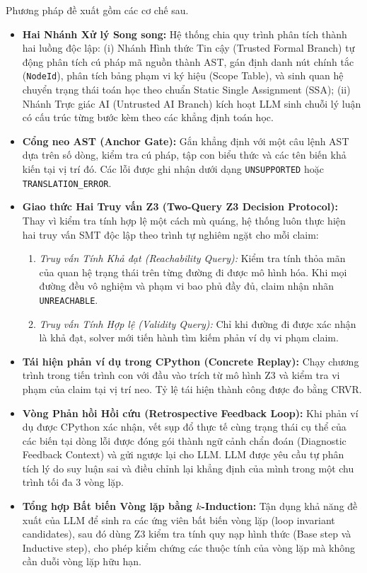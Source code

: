 Phương pháp đề xuất gồm các cơ chế sau.
\begin{itemize}
    \item \textbf{Hai Nhánh Xử lý Song song:} Hệ thống chia quy trình phân tích thành hai luồng độc lập: (i) Nhánh Hình thức Tin cậy (Trusted Formal Branch) tự động phân tích cú pháp mã nguồn thành AST, gán định danh nút chính tắc (\texttt{NodeId}), phân tích bảng phạm vi ký hiệu (Scope Table), và sinh quan hệ chuyển trạng thái toán học theo chuẩn Static Single Assignment (SSA); (ii) Nhánh Trực giác AI (Untrusted AI Branch) kích hoạt LLM sinh chuỗi lý luận có cấu trúc từng bước kèm theo các khẳng định toán học.
    \item \textbf{Cổng neo AST (Anchor Gate):} Gắn khẳng định với một câu lệnh AST dựa trên số dòng, kiểm tra cú pháp, tập con biểu thức và các tên biến khả kiến tại vị trí đó. Các lỗi được ghi nhận dưới dạng \texttt{UNSUPPORTED} hoặc \texttt{TRANSLATION\_ERROR}.
    \item \textbf{Giao thức Hai Truy vấn Z3 (Two-Query Z3 Decision Protocol):} Thay vì kiểm tra tính hợp lệ một cách mù quáng, hệ thống luôn thực hiện hai truy vấn SMT độc lập theo trình tự nghiêm ngặt cho mỗi claim:
    \begin{enumerate}
        \item \textit{Truy vấn Tính Khả đạt (Reachability Query):} Kiểm tra tính thỏa mãn của quan hệ trạng thái trên từng đường đi được mô hình hóa. Khi mọi đường đều vô nghiệm và phạm vi bao phủ đầy đủ, claim nhận nhãn \texttt{UNREACHABLE}.
        \item \textit{Truy vấn Tính Hợp lệ (Validity Query):} Chỉ khi đường đi được xác nhận là khả đạt, solver mới tiến hành tìm kiếm phản ví dụ vi phạm claim.
    \end{enumerate}
    \item \textbf{Tái hiện phản ví dụ trong CPython (Concrete Replay):} Chạy chương trình trong tiến trình con với đầu vào trích từ mô hình Z3 và kiểm tra vi phạm của claim tại vị trí neo. Tỷ lệ tái hiện thành công được đo bằng CRVR.
    \item \textbf{Vòng Phản hồi Hồi cứu (Retrospective Feedback Loop):} Khi phản ví dụ được CPython xác nhận, vết sụp đổ thực tế cùng trạng thái cụ thể của các biến tại dòng lỗi được đóng gói thành ngữ cảnh chẩn đoán (Diagnostic Feedback Context) và gửi ngược lại cho LLM. LLM được yêu cầu tự phân tích lý do suy luận sai và điều chỉnh lại khẳng định của mình trong một chu trình tối đa 3 vòng lặp.
    \item \textbf{Tổng hợp Bất biến Vòng lặp bằng $k$-Induction:} Tận dụng khả năng đề xuất của LLM để sinh ra các ứng viên bất biến vòng lặp (loop invariant candidates), sau đó dùng Z3 kiểm tra tính quy nạp hình thức (Base step và Inductive step), cho phép kiểm chứng các thuộc tính của vòng lặp mà không cần duỗi vòng lặp hữu hạn.
\end{itemize}

